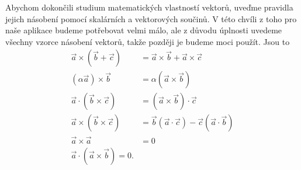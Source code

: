     Abychom dokončili studium matematických vlastností vektorů, uveďme pravidla jejich
    násobení pomocí skalárních a vektorových součinů. V této chvíli z toho pro naše aplikace
    budeme potřebovat velmi málo, ale z důvodu úplnosti uvedeme všechny vzorce násobení
    vektorů, takže později je budeme moci použít. Jsou to
    \begin{subequations}\label{fyz:eq719}
      \begin{align}
         \vec{a}\times(\vec{b}+\vec{c})&= %
            \vec{a}\times\vec{b}+\vec{a}\times\vec{c}                   \label{fyz:eq719a}  \\             
        (\alpha\vec{a})\times\vec{b}&= %
            \alpha(\vec{a}\times\vec{b})                                \label{fyz:eq719b}  \\     
         \vec{a}\cdot(\vec{b}\times\vec{c})&= %
            (\vec{a}\times\vec{b})\cdot\vec{c}                          \label{fyz:eq719c}  \\  
         \vec{a}\times(\vec{b}\times\vec{c})&= %
            \vec{b}(\vec{a}\cdot\vec{c})-\vec{c}(\vec{a}\cdot\vec{b})   \label{fyz:eq719d}  \\          
         \vec{a}\times\vec{a}&=0                                        \label{fyz:eq719e}  \\  
         \vec{a}\cdot(\vec{a}\times\vec{b})=0.                          \label{fyz:eq719f}
      \end{align}
    \end{subequations}

